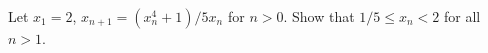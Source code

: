 Let $x_1 = 2$, $x_{n+1} = (x_n^4 + 1)/5x_n$ for $n > 0$. Show that $1/5 \leq x_n < 2$ for all $n > 1$.
